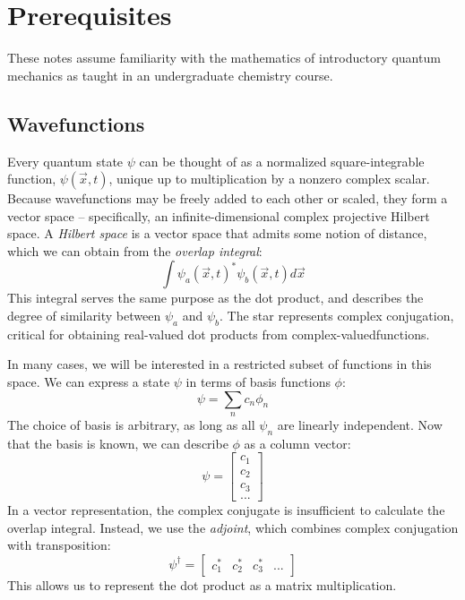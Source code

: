 \section*{Prerequisites}

These notes assume familiarity with the mathematics of introductory quantum mechanics as taught in
an undergraduate chemistry course.

\subsection*{Wavefunctions}

Every quantum state $\psi$ can be thought of as a normalized square-integrable function,
$\psi\left(\vec{x},t\right)$, unique up to multiplication by a nonzero complex scalar. Because
wavefunctions may be freely added to each other or scaled, they form a vector space -- specifically,
an infinite-dimensional complex projective Hilbert space. A \textit{Hilbert space} is a vector space
that admits some notion of distance, which we can obtain from the \textit{overlap integral}:
\begin{equation*}
\int \psi_a\left(\vec{x},t\right)^* \psi_b\left(\vec{x},t\right) d\vec{x}
\end{equation*}
This integral serves the same purpose as the dot product, and describes the degree of similarity
between $\psi_a$ and $\psi_b$. The star represents complex conjugation, critical for obtaining
real-valued dot products from complex-valuedfunctions.

In many cases, we will be interested in a restricted subset of functions in this space. We can
express a state $\psi$ in terms of basis functions $\phi$:
\begin{equation*}
\psi = \sum_{n} c_n \phi_n
\end{equation*}
The choice of basis is arbitrary, as long as all $\psi_n$ are linearly independent. Now that the
basis is known, we can describe $\phi$ as a column vector:
\begin{equation*}
\psi = \begin{bmatrix}
c_1 \\ c_2 \\ c_3 \\ ...
\end{bmatrix}
\end{equation*}
In a vector representation, the complex conjugate is insufficient to calculate the overlap integral.
Instead, we use the \textit{adjoint}, which combines complex conjugation with transposition:
\begin{equation*}
\psi^\dagger = \begin{bmatrix}
c_1^* & c_2^* & c_3^* & ...
\end{bmatrix}
\end{equation*}
This allows us to represent the dot product as a matrix multiplication.

